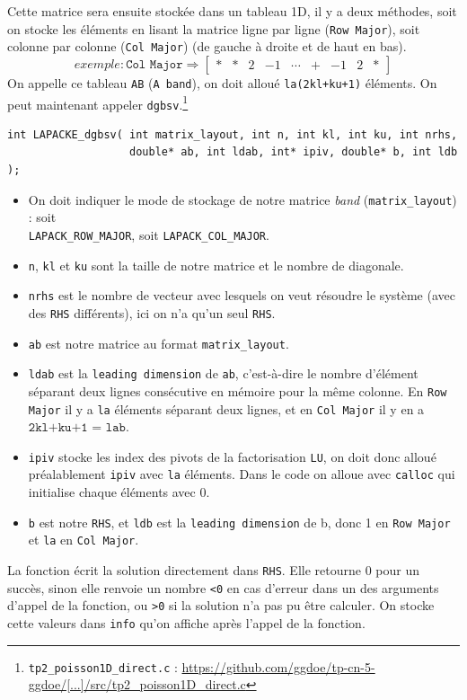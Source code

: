 \documentclass{article}
\begin{document}
Cette matrice sera ensuite stockée dans un tableau 1D, il y a deux méthodes, soit on stocke les éléments en lisant la matrice ligne par ligne (\texttt{Row Major}), soit colonne par colonne (\texttt{Col Major}) (de gauche à droite et de haut en bas).
\[ 
	exemple : \texttt{Col Major} \Longrightarrow
	\begin{bmatrix}
	\ast & \ast	& 2 & -1 & \cdots & \texttt{+} & -1 & 2 & \ast
	\end{bmatrix}
\]
On appelle ce tableau \texttt{AB} (\texttt{A band}), on doit alloué \texttt{la(2kl+ku+1)} éléments.
On peut maintenant appeler \texttt{dgbsv}.\footnote{\texttt{tp2\_poisson1D\_direct.c} : \href{https://github.com/ggdoe/tp-cn-5-ggdoe/blob/master/TP_Poisson_C_for_students/src/tp2_poisson1D_direct.c}{https://github.com/ggdoe/tp-cn-5-ggdoe/[...]/src/tp2\_poisson1D\_direct.c}}
\begin{scriptsize}
\begin{verbatim}
int LAPACKE_dgbsv( int matrix_layout, int n, int kl, int ku, int nrhs, 
                   double* ab, int ldab, int* ipiv, double* b, int ldb );
\end{verbatim}
\end{scriptsize}
\begin{itemize}
\item On doit indiquer le mode de stockage de notre matrice \textit{band} (\texttt{matrix\_layout}) : soit \\ \texttt{LAPACK\_ROW\_MAJOR}, soit \texttt{LAPACK\_COL\_MAJOR}.
\item \texttt{n}, \texttt{kl} et \texttt{ku} sont la taille de notre matrice et le nombre de diagonale.
\item \texttt{nrhs} est le nombre de vecteur avec lesquels on veut résoudre le système (avec des \texttt{RHS} différents), ici on n'a qu'un seul \texttt{RHS}.
\item \texttt{ab} est notre matrice au format \texttt{matrix\_layout}.
\item \texttt{ldab} est la \texttt{leading dimension} de \texttt{ab}, c'est-à-dire le nombre d'élément  séparant deux lignes consécutive en mémoire pour la même colonne. En \texttt{Row Major} il y a \texttt{la} éléments séparant deux lignes, et en \texttt{Col Major} il y en a $\texttt{2kl+ku+1 = lab}$.
\item \texttt{ipiv} stocke les index des pivots de la factorisation \texttt{LU}, on doit donc alloué préalablement \texttt{ipiv} avec \texttt{la} éléments. Dans le code on alloue avec \texttt{calloc} qui initialise chaque éléments avec 0.
\item \texttt{b} est notre \texttt{RHS}, et \texttt{ldb} est la \texttt{leading dimension} de b, donc 1 en \texttt{Row Major} et \texttt{la} en \texttt{Col Major}.
\end{itemize}
La fonction écrit la solution directement dans \texttt{RHS}.
Elle retourne 0 pour un succès, sinon elle renvoie un nombre \texttt{<0} en cas d'erreur dans un des arguments d'appel de la fonction, ou \texttt{>0} si la solution n'a pas pu être calculer. On stocke cette valeurs dans \texttt{info} qu'on affiche après l'appel de la fonction.
\end{document}
